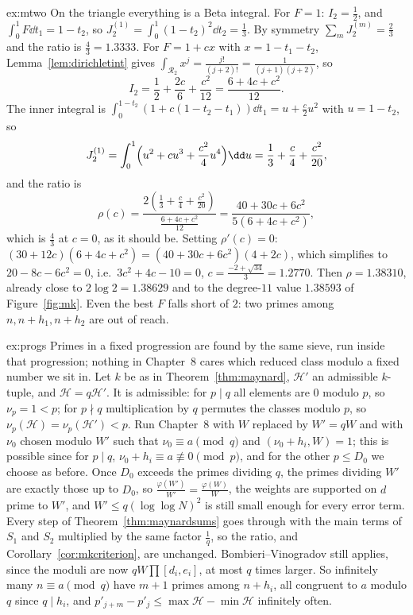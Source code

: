 \begin{solution}{ex:mtwo}
\idea On the triangle everything is a Beta integral.
\writeup For $F=1$: $I_2=\frac12$, and $\int_0^1F\dd t_1=1-t_2$, so $J_2^{(1)}=\int_0^1(1-t_2)^2\dd t_2=\frac13$. By symmetry $\sum_mJ_2^{(m)}=\frac23$ and the ratio is $\frac43=1.3333$. For $F=1+cx$ with $x=1-t_1-t_2$, Lemma~\ref{lem:dirichletint} gives $\int_{\mathcal R_2}x^j=\frac{j!}{(j+2)!}=\frac1{(j+1)(j+2)}$, so
\[
I_2=\frac12+\frac{2c}6+\frac{c^2}{12}=\frac{6+4c+c^2}{12}.
\]
The inner integral is $\int_0^{1-t_2}(1+c(1-t_2-t_1))\dd t_1=u+\frac c2u^2$ with $u=1-t_2$, so
\[
J_2^{(1)}=\int_0^1\Bigl(u^2+cu^3+\frac{c^2}4u^4\Bigr)\dd u=\frac13+\frac c4+\frac{c^2}{20},
\]
and the ratio is
\[
\rho(c)=\frac{2(\frac13+\frac c4+\frac{c^2}{20})}{\frac{6+4c+c^2}{12}}=\frac{40+30c+6c^2}{5(6+4c+c^2)},
\]
which is $\frac43$ at $c=0$, as it should be. Setting $\rho'(c)=0$: $(30+12c)(6+4c+c^2)=(40+30c+6c^2)(4+2c)$, which simplifies to $20-8c-6c^2=0$, i.e.\ $3c^2+4c-10=0$, $c=\frac{-2+\sqrt{34}}3=1.2770$. Then $\rho=1.38310$, already close to $2\log2=1.38629$ and to the degree-$11$ value $1.38593$ of Figure~\ref{fig:mk}. Even the best $F$ falls short of $2$: two primes among $n,n+h_1,n+h_2$ are out of reach.
\end{solution}

\begin{solution}{ex:progs}
\idea Primes in a fixed progression are found by the same sieve, run inside that progression; nothing in Chapter~8 cares which reduced class modulo a fixed number we sit in.
\writeup Let $k$ be as in Theorem~\ref{thm:maynard}, $\mathcal H'$ an admissible $k$-tuple, and $\mathcal H=q\mathcal H'$. It is admissible: for $p\mid q$ all elements are $0$ modulo $p$, so $\nu_p=1<p$; for $p\nmid q$ multiplication by $q$ permutes the classes modulo $p$, so $\nu_p(\mathcal H)=\nu_p(\mathcal H')<p$. Run Chapter~8 with $W$ replaced by $W'=qW$ and with $\nu_0$ chosen modulo $W'$ such that $\nu_0\equiv a\pmod q$ and $(\nu_0+h_i,W)=1$; this is possible since for $p\mid q$, $\nu_0+h_i\equiv a\not\equiv0\pmod p$, and for the other $p\le D_0$ we choose as before. Once $D_0$ exceeds the primes dividing $q$, the primes dividing $W'$ are exactly those up to $D_0$, so $\frac{\varphi(W')}{W'}=\frac{\varphi(W)}W$, the weights are supported on $d$ prime to $W'$, and $W'\le q(\log\log N)^2$ is still small enough for every error term. Every step of Theorem~\ref{thm:maynardsums} goes through with the main terms of $S_1$ and $S_2$ multiplied by the same factor $\frac1q$, so the ratio, and Corollary~\ref{cor:mkcriterion}, are unchanged. Bombieri--Vinogradov still applies, since the moduli are now $qW\prod[d_i,e_i]$, at most $q$ times larger. So infinitely many $n\equiv a\pmod q$ have $m+1$ primes among $n+h_i$, all congruent to $a$ modulo $q$ since $q\mid h_i$, and $p'_{j+m}-p'_j\le\max\mathcal H-\min\mathcal H$ infinitely often.
\end{solution}

